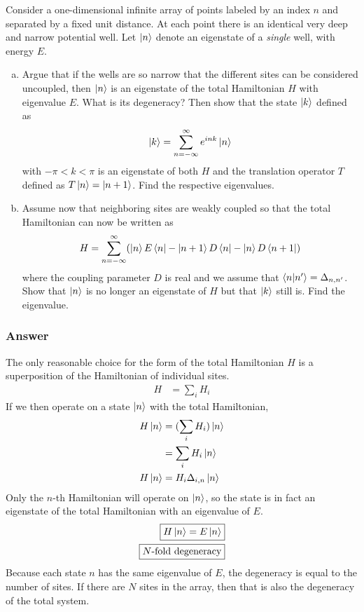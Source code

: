 Consider a one-dimensional infinite array of points labeled by an index $n$
and separated by a fixed unit distance. At each point there is an identical
very deep and narrow potential well. Let $\ket{n}$ denote an eigenstate of a
\emph{single} well, with energy $E$.
\begin{enumerate}[(a)]
    \item
        Argue that if the wells are so narrow that the different sites can
        be considered uncoupled, then $\ket{n}$ is an eigenstate of the
        total Hamiltonian $H$ with eigenvalue $E$. What is its degeneracy?
        Then show that the state $\ket{k}$ defined as
        \begin{align*}
            \ket{k} = \sum_{n=-\infty }^\infty  e^{ink} \ket{n}
        \end{align*}
        with $-{\pi} < k < {\pi}$ is an eigenstate of both $H$ and the translation
        operator $T$ defined as $T\ket{n} = \ket{n+1}$. Find the respective
        eigenvalues.
    \item
        Assume now that neighboring sites are weakly coupled so that the
        total Hamiltonian can now be written as
        \begin{align*}
            H = \sum_{n=-\infty }^\infty  ( \ket{n}E\bra{n} - \ket{n+1}D\bra{n} -
                \ket{n}D\bra{n+1} )
        \end{align*}
        where the coupling parameter $D$ is real and we assume that
        $\braket{n}{n'} = \Delta _{n,n'}$. Show that $\ket{n}$ is no longer an
        eigenstate of $H$ but that $\ket{k}$ still is. Find the eigenvalue.
\end{enumerate}

\subsubsection{Answer}

The only reasonable choice for the form of the total Hamiltonian $H$ is a
superposition of the Hamiltonian of individual sites.
\begin{align*}
    H &= \sum_i H_i
\end{align*}
If we then operate on a state $\ket{n}$ with the total Hamiltonian,
\begin{align*}
    H\ket{n} &= (\sum_i H_i)\ket{n} \\
    {} &= \sum_i H_i\ket{n} \\
    H\ket{n} &= H_i \Delta _{i,n} \ket{n}
\end{align*}
Only the $n$-th Hamiltonian will operate on $\ket{n}$, so the state is in fact
an eigenstate of the total Hamiltonian with an eigenvalue of $E$.
\begin{align}
    \boxed{ H\ket{n} = E\ket{n}} \\
    \boxed{ \text{$N$-fold degeneracy} }
\end{align}
Because each state $n$ has the same eigenvalue of $E$, the degeneracy is
equal to the number of sites. If there are $N$ sites in the array, then that
is also the degeneracy of the total system.

